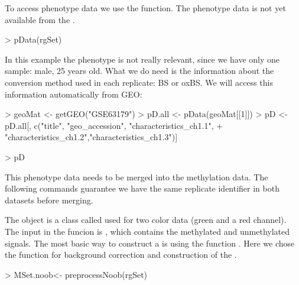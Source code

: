 \documentclass{article}
\begin{document}
To access phenotype data we use the  function. The phenotype data is not yet available from the .
\begin{Schunk}
\begin{Sinput}
> pData(rgSet)
\end{Sinput}
\end{Schunk}
In this example the phenotype is not really relevant, since we have only one sample: male, 25 years old. What we do need is the information about the conversion method used in each replicate: BS or oxBS. We will access this information automatically from GEO:
\begin{Schunk}
\begin{Sinput}
> geoMat <- getGEO("GSE63179")
> pD.all <- pData(geoMat[[1]])
> pD <- pD.all[, c("title", "geo_accession", "characteristics_ch1.1",
+                  "characteristics_ch1.2","characteristics_ch1.3")]
\end{Sinput}
\end{Schunk}



\begin{Schunk}
\begin{Sinput}
> pD
\end{Sinput}
\end{Schunk}


This phenotype data needs to be merged into the methylation data. The following commands guarantee we have the same replicate identifier in both datasets before merging.

\begin{Schunk}
\end{Schunk}

The  object is a class called  used for two color data (green and a red channel). The input in the  funcion is  , which contains the methylated and unmethylated signals. The most basic way to construct a  is  using the function . Here we chose the function  for background correction and construction of the .


\begin{Schunk}
\begin{Sinput}
> MSet.noob<- preprocessNoob(rgSet)
\end{Sinput}
\end{Schunk}
\end{document}
